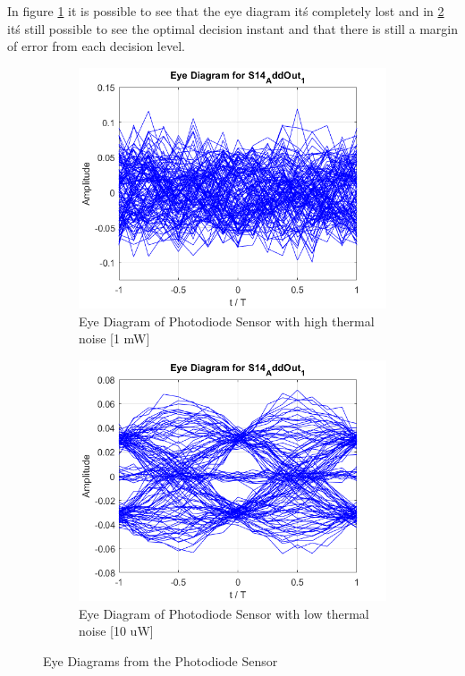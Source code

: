 In figure \ref{EyeDiagramThermal_a} it is possible to see that the eye diagram it\'s completely lost and in \ref{EyeDiagramThermal_b} it\'s still possible to see the optimal decision instant and that there is still a margin of error from each decision level.

\begin{figure}[H]
	\centering
        \begin{subfigure}{.45\textwidth}
        \centering
        	\includegraphics[scale=0.45]{./lib/m_qam_receiver/figures/Thermal5e-4.png}
        	\caption{Eye Diagram of Photodiode Sensor \newline with high thermal noise [1 mW]}\label{EyeDiagramThermal_a}
        \end{subfigure}%
        \begin{subfigure}{.45\textwidth}
        \centering
        	\includegraphics[scale=0.45]{./lib/m_qam_receiver/figures/Thermal1e-5.png}
        	\caption{Eye Diagram of Photodiode Sensor \newline with low thermal noise [10 uW]}\label{EyeDiagramThermal_b}
        \end{subfigure}
        \caption{Eye Diagrams from the Photodiode Sensor}\label{EyeDiagramThermal}
\end{figure}

